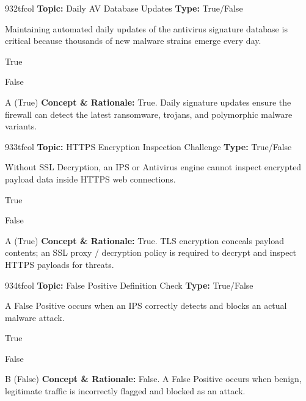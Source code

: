 \begin{qcard}{932}{tfcol}
\textcolor{darkslate!75}{\small\textbf{Topic:} Daily AV Database Updates \hfill \textbf{Type:} True/False}\vspace{0.4em}\par
Maintaining automated daily updates of the antivirus signature database is critical because thousands of new malware strains emerge every day.
\begin{qoptions}
\item True
\item False
\end{qoptions}
\end{qcard}
\nopagebreak
\begin{explainbox}{A (True)}
\textbf{Concept \& Rationale:} True. Daily signature updates ensure the firewall can detect the latest ransomware, trojans, and polymorphic malware variants.
\end{explainbox}

\begin{qcard}{933}{tfcol}
\textcolor{darkslate!75}{\small\textbf{Topic:} HTTPS Encryption Inspection Challenge \hfill \textbf{Type:} True/False}\vspace{0.4em}\par
Without SSL Decryption, an IPS or Antivirus engine cannot inspect encrypted payload data inside HTTPS web connections.
\begin{qoptions}
\item True
\item False
\end{qoptions}
\end{qcard}
\nopagebreak
\begin{explainbox}{A (True)}
\textbf{Concept \& Rationale:} True. TLS encryption conceals payload contents; an SSL proxy / decryption policy is required to decrypt and inspect HTTPS payloads for threats.
\end{explainbox}

\begin{qcard}{934}{tfcol}
\textcolor{darkslate!75}{\small\textbf{Topic:} False Positive Definition Check \hfill \textbf{Type:} True/False}\vspace{0.4em}\par
A False Positive occurs when an IPS correctly detects and blocks an actual malware attack.
\begin{qoptions}
\item True
\item False
\end{qoptions}
\end{qcard}
\nopagebreak
\begin{explainbox}{B (False)}
\textbf{Concept \& Rationale:} False. A False Positive occurs when benign, legitimate traffic is incorrectly flagged and blocked as an attack.
\end{explainbox}

